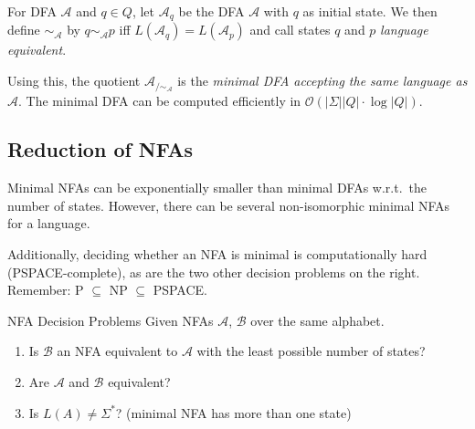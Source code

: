 \documentclass[english]{panikzettel}
\begin{document}
For DFA $\mathcal{A}$ and $q \in Q$, let $\mathcal{A}_q$ be the DFA $\mathcal{A}$ with $q$ as initial state.
We then define $\sim_\mathcal{A}$ by $q \sim_\mathcal{A} p$ iff $L(\mathcal{A}_q) = L(\mathcal{A}_p)$ and call states $q$ and $p$ \emph{language equivalent}.

Using this, the quotient $\mathcal{A}_{/\sim_\mathcal{A}}$ is the \emph{minimal DFA accepting the same language as $\mathcal{A}$}.
The minimal DFA can be computed efficiently in $\mathcal{O}(|\Sigma||Q| \cdot \log |Q|)$.

\subsection{Reduction of NFAs}

\begin{halfboxl}
    Minimal NFAs can be exponentially smaller than minimal DFAs w.r.t.\ the number of states.
    However, there can be several non-isomorphic minimal NFAs for a language.

    Additionally, deciding whether an NFA is minimal is computationally hard (PSPACE-complete), as are the two other decision problems on the right.
    Remember: P $\subseteq$ NP $\subseteq$ PSPACE.
\end{halfboxl}%
\begin{halfboxr}
    \vspace{-\baselineskip}
    \begin{defi}{NFA Decision Problems}
        Given NFAs $\mathcal{A}$, $\mathcal{B}$ over the same alphabet.

        \begin{enumerate}
            \item  Is $\mathcal{B}$ an NFA equivalent to $\mathcal{A}$ with the least possible number of states?
            \item Are $\mathcal{A}$ and $\mathcal{B}$ equivalent?
            \item Is $L(A) \neq \Sigma^*$? (minimal NFA has more than one state)
        \end{enumerate}
    \end{defi}
\end{halfboxr}


\end{document}
